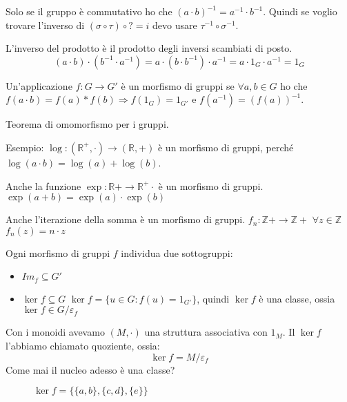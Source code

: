 Solo se il gruppo \`e commutativo ho che $(a \cdot b)^{-1} = a^{-1} \cdot b^{-1}$. Quindi se voglio trovare l'inverso di $(\sigma \circ \tau) \circ ? = i$ devo usare $\tau^{-1} \circ \sigma^{-1}$.

L'inverso del prodotto \`e il prodotto degli inversi scambiati di posto.
\[
(a \cdot b) \cdot (b^{-1} \cdot a^{-1}) = a \cdot (b \cdot b^{-1}) 
\cdot a^{-1} = a \cdot 1_G \cdot a^{-1} = 1_G
\]

Un'applicazione $f : G \to G'$ \`e un morfismo di gruppi se $\forall a, b \in G$ ho che $f(a \cdot b) = f(a) \ast f(b) \Rightarrow f(1_G) = 1_{G'}$ e $f(a^{-1}) = (f(a))^{-1}$.

Teorema di omomorfismo per i gruppi.

Esempio: $\log : (\mathbb{R}^{+}, \cdot) \to (\mathbb{R}, +)$ \`e un morfismo di gruppi, perch\'e $\log(a \cdot b) = \log(a) + \log(b)$.

Anche la funzione $\exp : \mathbb{R} + \to \mathbb{R}^{+} \cdot$ \`e un morfismo di gruppi.  $\exp(a + b) = \exp(a) \cdot \exp(b)$

Anche l'iterazione della somma \`e un morfismo di gruppi. $f_n : \mathbb{Z} + \to \mathbb{Z} + $ $\forall z \in \mathbb{Z}$ $f_n(z) = n \cdot z$

Ogni morfismo di gruppi $f$ individua due sottogruppi:
\begin{itemize}
    \item $Im_f \subseteq G'$
    \item $\ker f \subseteq G$ $\ker f = \{ u \in G : f(u) = 1_{G'}\}$, quindi $\ker f$ \`e una classe, ossia $\ker f \in G / \varepsilon_f$
\end{itemize}

Con i monoidi avevamo $(M, \cdot)$ una struttura associativa con $1_M$. Il $\ker f$ l'abbiamo chiamato quoziente, ossia:
\[
\ker f = M / \varepsilon_f
\]
Come mai il nucleo adesso \`e una classe? 

\begin{figure}[ht]
\centering
{}
\caption{\label{fig:esempio_funzione}$\ker f = \{ \{a, b \}, \{ c, d \}, \{ e \}\}$ }
\end{figure}

